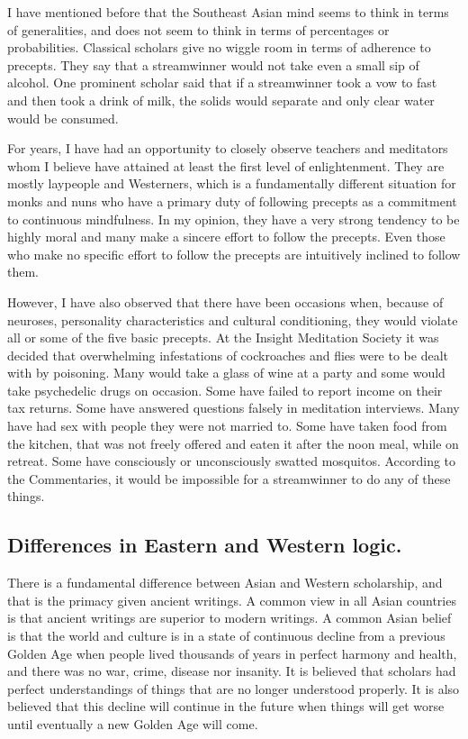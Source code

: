 \documentclass[a5paper,10pt,english]{book}
\begin{document}
\sphinxAtStartPar
I have mentioned before that the Southeast Asian mind seems to think in
terms of generalities, and does not seem to think in terms of
percentages or probabilities. Classical scholars give no wiggle room in
terms of adherence to precepts. They say that a stream\sphinxhyphen{}winner would not
take even a small sip of alcohol. One prominent scholar said that if a
stream\sphinxhyphen{}winner took a vow to fast and then took a drink of milk, the
solids would separate and only clear water would be consumed.

\sphinxAtStartPar
For years, I have had an opportunity to closely observe teachers and
meditators whom I believe have attained at least the first level of
enlightenment. They are mostly laypeople and Westerners, which is a
fundamentally different situation for monks and nuns who have a primary
duty of following precepts as a commitment to continuous mindfulness. In
my opinion, they have a very strong tendency to be highly moral and many
make a sincere effort to follow the precepts. Even those who make no
specific effort to follow the precepts are intuitively inclined to
follow them.

\sphinxAtStartPar
However, I have also observed that there have been occasions when,
because of neuroses, personality characteristics and cultural
conditioning, they would violate all or some of the five basic precepts.
At the Insight Meditation Society it was decided that overwhelming
infestations of cockroaches and flies were to be dealt with by
poisoning. Many would take a glass of wine at a party and some would
take psychedelic drugs on occasion. Some have failed to report income on
their tax returns. Some have answered questions falsely in meditation
interviews. Many have had sex with people they were not married to. Some
have taken food from the kitchen, that was not freely offered and eaten
it after the noon meal, while on retreat. Some have consciously or
unconsciously swatted mosquitos. According to the Commentaries, it would
be impossible for a stream\sphinxhyphen{}winner to do any of these things.


\subsection{Differences in Eastern and Western logic.}
\label{\detokenize{saints:differences-in-eastern-and-western-logic}}
\sphinxAtStartPar
There is a fundamental difference between Asian and Western scholarship,
and that is the primacy given ancient writings. A common view in all
Asian countries is that ancient writings are superior to modern
writings. A common Asian belief is that the world and culture is in a
state of continuous decline from a previous Golden Age when people lived
thousands of years in perfect harmony and health, and there was no war,
crime, disease nor insanity. It is believed that scholars had perfect
understandings of things that are no longer understood properly. It is
also believed that this decline will continue in the future when things
will get worse until eventually a new Golden Age will come.
\end{document}
